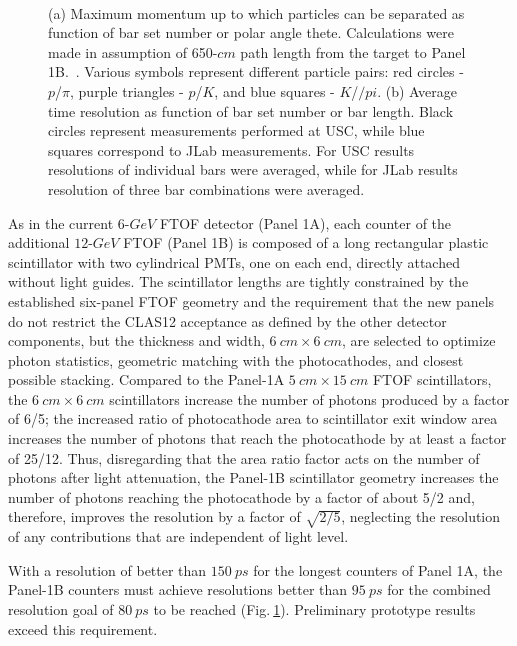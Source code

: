 \begin{figure}[h!]
\centering
\mbox{\quad
{}}
\caption{(a) Maximum momentum up to which particles can be separated as function of bar set number or polar angle thete. Calculations were made in assumption of 650-$cm$ path length from the target to Panel 1B.~\cite{tdr}. Various symbols represent different particle pairs:  red circles - $p$/$\pi$, purple triangles - $p$/$K$, and  blue squares - $K$/$/pi$. (b) Average time resolution as function of bar set number or bar length. Black circles represent measurements performed at USC, while blue squares correspond to JLab measurements. For USC results resolutions of individual bars were averaged, while for JLab results resolution of three bar combinations were averaged. \label{fig:partIdReq}\label{fig:resLength}}
\end{figure}

As in the current $6$-$GeV$ FTOF detector (Panel 1A), each counter of the additional $12$-$GeV$ FTOF (Panel 1B) is composed of a long rectangular plastic scintillator with two cylindrical PMTs, one on each end, directly attached without light guides. The scintillator lengths are tightly constrained by the established six-panel FTOF geometry and the requirement that the new panels do not  restrict the CLAS12 acceptance as defined by the other detector components, but the thickness and width, $6\:cm \times 6\:cm$, are selected to optimize photon statistics, geometric matching with the photocathodes, and closest possible stacking. Compared to the Panel-1A $5\:cm \times 15\:cm$ FTOF scintillators, the $6\:cm \times 6\:cm$ scintillators increase the number of photons produced by a factor of 6/5; the increased ratio of photocathode area to scintillator exit window area increases the number of photons that reach the photocathode by at least a factor of 25/12.  Thus, disregarding that the area ratio factor acts on the number of photons after light attenuation, the Panel-1B scintillator geometry increases the number of photons reaching the photocathode by a factor of about 5/2 and, therefore, improves the resolution by a factor of $\sqrt{2/5}$, neglecting the resolution of any contributions that are independent of light level.

With a resolution of better than $150\:ps$ for the longest counters of Panel 1A, the Panel-1B counters must achieve resolutions better than $95\:ps$ for the combined resolution goal of $80\:ps$ to be reached (Fig.$\:$\ref{fig:resLength}). Preliminary prototype results exceed this requirement.
